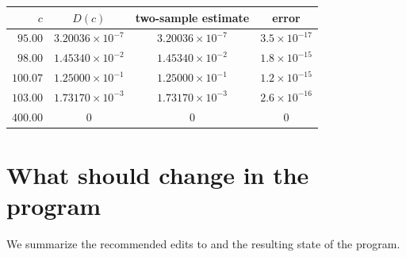 \documentclass[11pt]{amsart}
\theoremstyle{definition}
\theoremstyle{remark}
\begin{document}
\begin{center}
\small
\begin{tabular}{rccc}
\toprule
$c$ & $D(c)$ & two-sample estimate & error\\
\midrule
$95.00$ & $3.20036\times10^{-7}$ & $3.20036\times10^{-7}$ & $3.5\times10^{-17}$\\
$98.00$ & $1.45340\times10^{-2}$ & $1.45340\times10^{-2}$ & $1.8\times10^{-15}$\\
$100.07$ & $1.25000\times10^{-1}$ & $1.25000\times10^{-1}$ & $1.2\times10^{-15}$\\
$103.00$ & $1.73170\times10^{-3}$ & $1.73170\times10^{-3}$ & $2.6\times10^{-16}$\\
$400.00$ & $0$ & $0$ & $0$\\
\bottomrule
\end{tabular}
\end{center}

\section{What should change in the program}\label{sec:consequences}

We summarize the recommended edits to \cite{SI} and the resulting state of the program.
\end{document}
